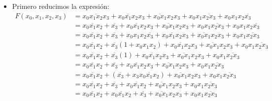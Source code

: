 \documentclass[answers]{exam}
\begin{document}
\begin{questions}
\begin{solution}
\begin{itemize}
      \item Primero reducimos la expresión:
            \begin{align*}
              F(x_{0}, x_{1}, x_{2}, x_{3})
              &= \overline{x_{0}x_{1}x_{2}x_{3}} + \overline{x_{0}x_{1}x_{2}}x_{3}
                + \overline{x_{0}x_{1}}x_{2}x_{3} + x_{0}x_{1}\overline{x_{2}x_{3}}
                + x_{0}x_{1}x_{2}\overline{x_{3}} \\
              &= \overline{x_{0}x_{1}x_{2}} + \overline{x_{3}}
                + \overline{x_{0}x_{1}x_{2}}x_{3} + \overline{x_{0}x_{1}}x_{2}x_{3}
                + x_{0}x_{1}\overline{x_{2}x_{3}} + x_{0}x_{1}x_{2}\overline{x_{3}}
                \tag{por Leyes de Morgan} \\
              &= \overline{x_{0}x_{1}x_{2}} + \overline{x_{3}}
                + x_{0}x_{1}x_{2}\overline{x_{3}} + \overline{x_{0}x_{1}x_{2}}x_{3}
                + \overline{x_{0}x_{1}}x_{2}x_{3} + x_{0}x_{1}\overline{x_{2}x_{3}}
                \tag{por Asociatividad} \\
              &= \overline{x_{0}x_{1}x_{2}} + \overline{x_{3}}(1 + x_{0}x_{1}x_{2})
                + \overline{x_{0}x_{1}x_{2}}x_{3} + \overline{x_{0}x_{1}}x_{2}x_{3}
                + x_{0}x_{1}\overline{x_{2}x_{3}} \tag{por Distributividad} \\
              &= \overline{x_{0}x_{1}x_{2}} + \overline{x_{3}}(1)
                + \overline{x_{0}x_{1}x_{2}}x_{3} + \overline{x_{0}x_{1}}x_{2}x_{3}
                + x_{0}x_{1}\overline{x_{2}x_{3}} \tag{por Aniquilación} \\
              &= \overline{x_{0}x_{1}x_{2}} + \overline{x_{3}}
                + \overline{x_{0}x_{1}x_{2}}x_{3} + \overline{x_{0}x_{1}}x_{2}x_{3}
                + x_{0}x_{1}\overline{x_{2}x_{3}} \tag{por Identidad} \\
              &= \overline{x_{0}x_{1}x_{2}} + (\overline{x_{3}}
                + x_{3}\overline{x_{0}x_{1}x_{2}}) + \overline{x_{0}x_{1}}x_{2}x_{3}
                + x_{0}x_{1}\overline{x_{2}x_{3}} \tag{por Asociatividad} \\
              &= \overline{x_{0}x_{1}x_{2}} + \overline{x_{3}}
                + \overline{x_{0}x_{1}x_{2}} + \overline{x_{0}x_{1}}x_{2}x_{3}
                + x_{0}x_{1}\overline{x_{2}x_{3}} \tag{por Eliminación} \\
              &= \overline{x_{0}x_{1}x_{2}} + \overline{x_{0}x_{1}x_{2}}
                + \overline{x_{3}} + \overline{x_{0}x_{1}}x_{2}x_{3}
                + x_{0}x_{1}\overline{x_{2}x_{3}} \tag{por Asociatividad} \\

\end{align*}
\end{itemize}
\end{solution}
\end{questions}
\end{document}
